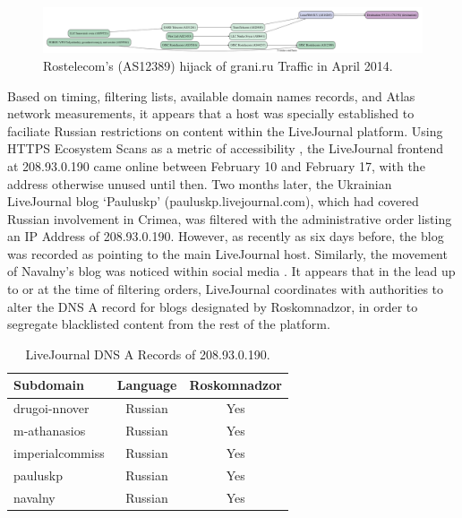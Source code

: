 \begin{figure}
  \includegraphics[width=\textwidth]{diagrams/atlas_cache-results-measurement_id-1663748.png}
  \caption{Rostelecom's (AS12389) hijack of grani.ru Traffic in April 2014.}
  \label{image:ru-grani-hijack}
\end{figure}

Based on timing, filtering lists, available domain names records, and
Atlas network measurements, it appears that a host was specially
established to faciliate Russian restrictions on content within the
LiveJournal platform. Using HTTPS Ecosystem Scans as a metric of
accessibility \cite{projectsonar}, the LiveJournal frontend at
208.93.0.190 came online between February 10 and February 17, with the
address otherwise unused until then. Two months later, the Ukrainian
LiveJournal blog `Pauluskp' (pauluskp.livejournal.com), which had
covered Russian involvement in Crimea, was filtered with the
administrative order listing an IP Address of 208.93.0.190. However, as
recently as six days before, the blog was recorded as pointing to the
main LiveJournal host. Similarly, the movement of Navalny's blog was
noticed within social media \cite{miptru2014}. It appears that in the
lead up to or at the time of filtering orders, LiveJournal coordinates
with authorities to alter the DNS A record for blogs designated by
Roskomnadzor, in order to segregate blacklisted content from the rest of
the platform.

\begin{table}
    \begin{tabular}{l c c}
        \textbf{Subdomain} & \textbf{Language} & \textbf{Roskomnadzor}\\
        \hline
        drugoi-nnover & Russian & Yes\\
        m-athanasios & Russian & Yes\\
        imperialcommiss & Russian & Yes\\
        pauluskp & Russian & Yes \\
        navalny & Russian & Yes \\
        \hline
    \end{tabular}
    \caption{LiveJournal DNS A Records of 208.93.0.190.}
    \label{table:lj-blocked-blogs}
\end{table}

